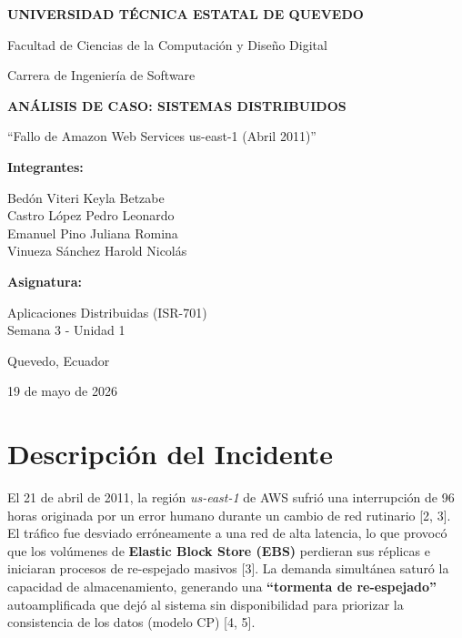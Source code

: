 \documentclass[12pt,a4paper]{article}
\begin{document}
\begin{titlepage}
    \centering
    \vspace*{1cm}
    {\bfseries\Large UNIVERSIDAD TÉCNICA ESTATAL DE QUEVEDO \par}
    \vspace{0.5cm}
    {\large Facultad de Ciencias de la Computación y Diseño Digital \par}
    {\large Carrera de Ingeniería de Software \par}
    \vfill
    {\bfseries\Large ANÁLISIS DE CASO: SISTEMAS DISTRIBUIDOS \par}
    \vspace{0.5cm}
    {\Large ``Fallo de Amazon Web Services us-east-1 (Abril 2011)'' \par}
    \vfill
    {\bfseries Integrantes: \par}
    \vspace{0.3cm}
    Bedón Viteri Keyla Betzabe \\
    Castro López Pedro Leonardo \\
    Emanuel Pino Juliana Romina \\
    Vinueza Sánchez Harold Nicolás \\
    \vfill
    {\bfseries Asignatura: \par}
    Aplicaciones Distribuidas (ISR-701) \\
    Semana 3 - Unidad 1
    \vfill
    {\large Quevedo, Ecuador \par}
    {\large 19 de mayo de 2026 \par}
\end{titlepage}

\newpage

\section{Descripción del Incidente}
El 21 de abril de 2011, la región \textit{us-east-1} de AWS sufrió una interrupción de 96 horas originada por un error humano durante un cambio de red rutinario [2, 3]. El tráfico fue desviado erróneamente a una red de alta latencia, lo que provocó que los volúmenes de \textbf{Elastic Block Store (EBS)} perdieran sus réplicas e iniciaran procesos de re-espejado masivos [3]. La demanda simultánea saturó la capacidad de almacenamiento, generando una \textbf{``tormenta de re-espejado''} autoamplificada que dejó al sistema sin disponibilidad para priorizar la consistencia de los datos (modelo CP) [4, 5].
\end{document}
